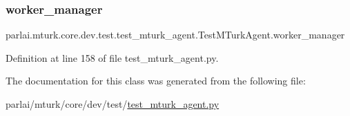 \subsubsection{\texorpdfstring{worker\+\_\+manager}{worker\_manager}}
{\footnotesize\ttfamily parlai.\+mturk.\+core.\+dev.\+test.\+test\+\_\+mturk\+\_\+agent.\+Test\+M\+Turk\+Agent.\+worker\+\_\+manager}



Definition at line 158 of file test\+\_\+mturk\+\_\+agent.\+py.



The documentation for this class was generated from the following file\+:\begin{DoxyCompactItemize}
\item 
parlai/mturk/core/dev/test/\hyperlink{dev_2test_2test__mturk__agent_8py}{test\+\_\+mturk\+\_\+agent.\+py}\end{DoxyCompactItemize}

